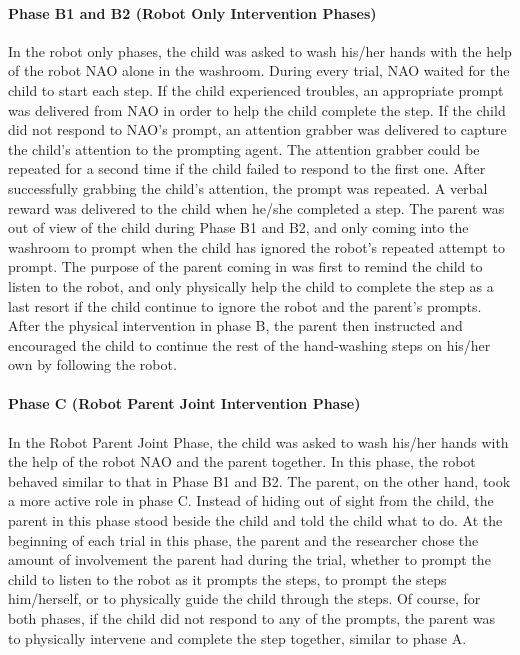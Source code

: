 \documentclass{ut-thesis}
\begin{document}
\paragraph{Phase B1 and B2 (Robot Only Intervention Phases)}
In the robot only phases, the child was asked to wash his/her hands with the help of the robot NAO alone in the washroom. During every trial, NAO waited for the child to start each step. If the child experienced troubles, an appropriate prompt was delivered from NAO in order to help the child complete the step. If the child did not respond to NAO's prompt, an attention grabber was delivered to capture the child's attention to the prompting agent. The attention grabber could be repeated for a second time if the child failed to respond to the first one.  After successfully grabbing the child's attention, the prompt was repeated.  A verbal reward was delivered to the child when he/she completed a step.  The parent was out of view of the child during Phase B1 and B2, and only coming into the washroom to prompt when the child has ignored the robot's repeated attempt to prompt.  The purpose of the parent coming in was first to remind the child to listen to the robot, and only physically help the child to complete the step as a last resort if the child continue to ignore the robot and the parent's prompts.  After the physical intervention in phase B, the parent then instructed and encouraged the child to continue the rest of the hand-washing steps on his/her own by following the robot.


\paragraph{Phase C (Robot Parent Joint Intervention Phase)}
In the Robot Parent Joint Phase, the child was asked to wash his/her hands with the help of the robot NAO and the parent together.  In this phase, the robot behaved similar to that in Phase B1 and B2.  The parent, on the other hand, took a more active role in phase C.  Instead of hiding out of sight from the child, the parent in this phase stood beside the child and told the child what to do.  At the beginning of each trial in this phase, the parent and the researcher chose the amount of involvement the parent had during the trial, whether to prompt the child to listen to the robot as it prompts the steps, to prompt the steps him/herself, or to physically guide the child through the steps.  Of course, for both phases, if the child did not respond to any of the prompts, the parent was to physically intervene and complete the step together, similar to phase A.
\end{document}

